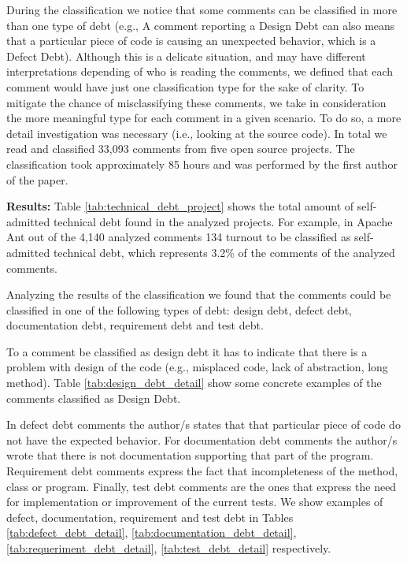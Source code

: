 During the classification we notice that some comments can be classified in more than one type of debt (e.g., A comment reporting a Design Debt can also means that a particular piece of code is causing an unexpected behavior, which is a Defect Debt). Although this is a delicate situation, and may have different interpretations depending of who is reading the comments, we defined that each comment would have just one classification type for the sake of clarity. To mitigate the chance of misclassifying these comments, we take in consideration the more meaningful type for each comment in a given scenario. To do so, a more detail investigation was necessary (i.e., looking at the source code). In total we read and classified 33,093 comments from five open source projects. The classification took approximately 85 hours and was performed by the first author of the paper. 


\vspace{1mm}
\noindent\textbf{Results:} Table \ref{tab:technical_debt_project} shows the total amount of self-admitted technical debt found in the analyzed projects. For example, in Apache Ant out of the 4,140 analyzed comments 134 turnout to be classified as self-admitted technical debt, which represents 3.2\% of the comments of the analyzed comments. 

Analyzing the results of the classification we found that the comments could be classified in one of the following types of debt: design debt, defect debt, documentation debt, requirement debt and  test debt. 
 
To a comment be classified as design debt it has to indicate that there is a problem with design of the code (e.g., misplaced code, lack of abstraction, long method). Table \ref{tab:design_debt_detail} show some concrete examples of the comments classified as Design Debt. 

In defect debt comments the author/s states that that particular piece of code do not have the expected behavior. For documentation debt comments the author/s wrote that there is not documentation supporting that part of the program. Requirement debt comments express the fact that incompleteness of the method, class or program. Finally, test debt comments are the ones that express the need for implementation or improvement of the current tests. We show examples of defect, documentation, requirement and test debt in Tables \ref{tab:defect_debt_detail}, \ref{tab:documentation_debt_detail}, \ref{tab:requeriment_debt_detail}, \ref{tab:test_debt_detail} respectively.   

